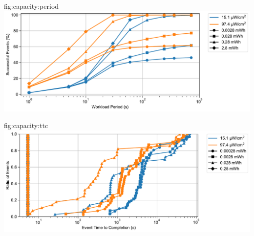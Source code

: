 \begin{definefigure}{fig:capacity:period}
      \centering
      \includegraphics[width=\linewidth]{figs/capacity/sense_and_send/usage_reliability_v_period/events_vs_period.pdf}
    \caption{
    The performance of workloads with different periodicity with four decades of energy capacity.
    We investigate the period at which different secondary storage sizes
    meet a specific availability, showing that even with infrequent periodic
    workloads, small amounts of secondary storage have low availability while
    larger secondary stores approach 100\% availability. 
    } 
\end{definefigure}
    
\begin{definefigure}{fig:capacity:ttc}
      \centering
      \includegraphics[width=\linewidth]{figs/capacity/ota_update/ttc_ota}
      \caption{
      A CDF of time to completion of a long-running, high energy event.
        In this
        workload, events are not atomic, and can be paused and resumed based on
        available energy. With secondary capacities that are large relative to the
        workload (which takes 93\,mJ) we see immediate completion.
        However, performing the event on smaller secondary capacities can take
        between three hours and a day to complete even for scenarios with large
        amounts of harvestable ambient energy.
      }
\end{definefigure}

